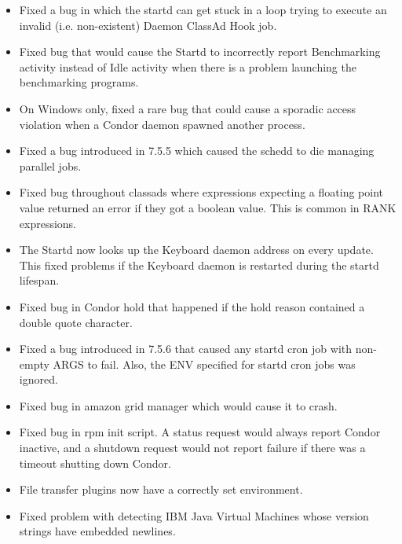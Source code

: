 \begin{itemize}

\item Fixed a bug in which the startd can get stuck in a
loop trying to execute an invalid (i.e. non-existent) Daemon ClassAd Hook job.

\item Fixed bug that would cause the Startd to incorrectly
report Benchmarking activity instead of Idle activity when there
is a problem launching the benchmarking programs.

\item On Windows only, fixed a rare bug that could cause
a sporadic access violation when a Condor daemon spawned another process.

\item Fixed a bug introduced in 7.5.5 which caused the
schedd to die managing parallel jobs.

\item Fixed bug throughout classads where expressions expecting
a floating point value returned an error if they got a boolean
value.  This is common in RANK expressions.

\item The Startd now looks up the Keyboard daemon address
on every update.  This fixed problems if the Keyboard
daemon is restarted during the startd lifespan.

\item Fixed bug in Condor hold that happened if the hold
reason contained a double quote character.

\item Fixed a bug introduced in 7.5.6 that
caused any startd cron job with non-empty ARGS to fail.
Also, the ENV specified for startd cron jobs was ignored.

\item Fixed bug in amazon grid manager which would cause it to crash.

\item Fixed bug in rpm init script. A status request would always report Condor inactive, and a shutdown request would not report failure if there was a
timeout shutting down Condor.

\item File transfer plugins now have a correctly set environment.

\item Fixed problem with detecting IBM Java Virtual Machines whose
version strings have embedded newlines.


\end{itemize}

